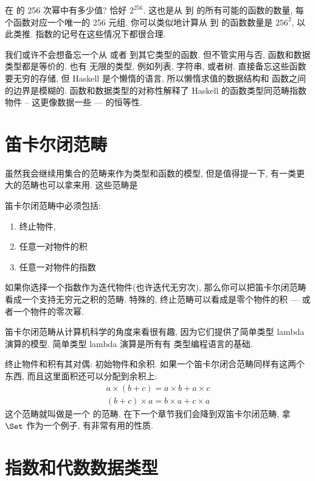 在  的 256 次幂中有多少值? 恰好 $2^{256}$. 这也是从  到  的所有可能的函数的数量,
每个函数对应一个唯一的 256 元组. 你可以类似地计算从  到  的函数数量是 $256^{2}$, 以此类推.
指数的记号在这些情况下都很合理.

我们或许不会想备忘一个从  或者  到其它类型的函数. 但不管实用与否, 函数和数据类型都是等价的. 也有
无限的类型, 例如列表, 字符串, 或者树. 直接备忘这些函数要无穷的存储, 但 Haskell 是个懒惰的语言, 所以懒惰求值的数据结构和
函数之间的边界是模糊的. 函数和数据类型的对称性解释了 Haskell 的函数类型同范畴指数物件 -- 这更像数据一些 --- 的恒等性.


\section{笛卡尔闭范畴}

虽然我会继续用集合的范畴来作为类型和函数的模型, 但是值得提一下, 有一类更大的范畴也可以拿来用. 这些范畴是

笛卡尔闭范畴中必须包括:

\begin{enumerate}
  \tightlist
  \item
        终止物件,
  \item
        任意一对物件的积
  \item
        任意一对物件的指数
\end{enumerate}
如果你选择一个指数作为迭代物件(也许迭代无穷次), 那么你可以把笛卡尔闭范畴看成一个支持无穷元之积的范畴. 特殊的,
终止范畴可以看成是零个物件的积 --- 或者一个物件的零次幂.

笛卡尔闭范畴从计算机科学的角度来看很有趣, 因为它们提供了简单类型 lambda 演算的模型. 简单类型 lambda 演算是所有有
类型编程语言的基础.

终止物件和积有其对偶: 初始物件和余积. 如果一个笛卡尔闭合范畴同样有这两个东西, 而且这里面积还可以分配到余积上:
\begin{gather*}
  a \times (b + c) = a \times b + a \times c \\
  (b + c) \times a = b \times a + c \times a
\end{gather*}
这个范畴就叫做是一个 的范畴. 在下一个章节我们会降到双笛卡尔闭范畴,
拿 $\Set$ 作为一个例子, 有非常有用的性质.

\section{指数和代数数据类型}

